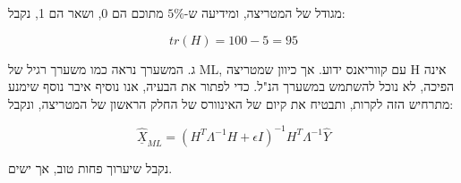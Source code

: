 \documentclass[a4paper]{iacas}
\begin{document}
\begin{hebrew}

מגודל של המטריצה, ומידיעה ש-$5\%$ מתוכם הם 0, ושאר הם 1, נקבל:
\end{hebrew}
\begin{equation*}
tr(H) = 100 - 5 = 95
\end{equation*}

\begin{hebrew}
ג. המשערך נראה כמו משערך רגיל של ML, עם קווריאנס ידוע.  אך כיוון שמטריצה H אינה הפיכה, לא נוכל להשתמש במשערך הנ"ל. כדי לפתור את הבעיה, אנו נוסיף איבר נוסף שימנע מתרחיש הזה לקרות, ותבטיח את קיום של האינוורס של החלק הראשון של המטריצה, ונקבל:
\end{hebrew}

\begin{equation*}
\underline{\hat{X}}_{ML} = (H^{T}\Lambda^{-1}H + \epsilon I)^{-1}H^{T}\Lambda^{-1}\hat{Y}
\end{equation*}

\begin{hebrew}
נקבל שיערוך פחות טוב, אך ישים.
\end{hebrew}





\end{document}
